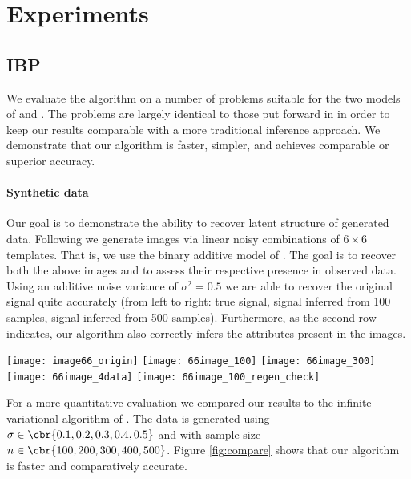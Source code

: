 \documentclass[twoside,11pt]{article}
\begin{document}
{\section{Experiments}
\label{sec:experiment}
\subsection{IBP}

We evaluate the algorithm on a number of problems suitable for the two
models of  and . The problems are largely
identical to those put forward in \cite{GriGha11} in order to keep our
results comparable with a more traditional inference approach. We demonstrate 
that our algorithm is faster, simpler, and achieves comparable or superior accuracy.
\paragraph{Synthetic data}

Our goal is to demonstrate the ability to recover latent structure of
generated data. Following \cite{GriGha11} we generate images via
linear noisy combinations of $6 \times 6$ templates.  That is, we use
the binary additive model of .  The goal is to recover
both the above images and to assess their respective presence in
observed data. Using an additive noise variance of $\sigma^2 = 0.5$ we
are able to recover the original signal quite accurately (from left to
right: true signal, signal inferred from 100 samples, signal inferred
from 500 samples). Furthermore, as the second row indicates, our
algorithm also correctly infers the attributes present in the images.

\noindent
\texttt{[image: image66\_origin]}
\hspace{0.05\columnwidth}
\texttt{[image: 66image\_100]} 
\hspace{0.05\columnwidth}
\texttt{[image: 66image\_300]} \\[-5mm]

\noindent
\hspace{0.34\columnwidth}
\texttt{[image: 66image\_4data]}
\hspace{0.05\columnwidth}
\texttt{[image: 66image\_100\_regen\_check]}

For a more quantitative evaluation we compared our results to the
infinite variational algorithm of \cite{DosMilGaeTeh09}. The data is
generated using $\sigma \in \cbr{0.1, 0.2, 0.3, 0.4, 0.5}$ and with
sample size $n \in \cbr{100, 200, 300, 400, 500}$. Figure
\ref{fig:compare} shows that our algorithm is faster and comparatively accurate.

}
\end{document}
